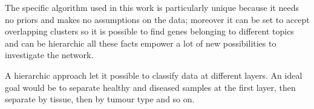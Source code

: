 The specific algorithm used in this work is particularly unique because it needs no priors and makes no assumptions on the data; moreover it can be set to accept overlapping clusters so it is possible to find genes belonging to different topics and can be hierarchic all these facts empower a lot of new possibilities to investigate the network. 

A hierarchic approach let it possible to classify data at different layers. An ideal goal would be to separate healthy and diseased 
samples at the first layer, then separate by tissue, then by tumour type and so on. 
